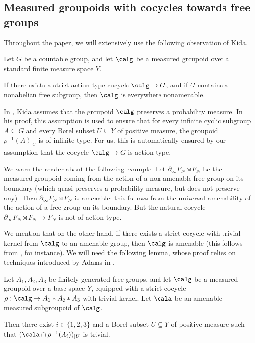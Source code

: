 \subsection{Measured groupoids with cocycles towards free groups}

Throughout the paper, we will extensively use the following observation of Kida.

\begin{lemma}\label{lemma:everywhere-nonamenable}
Let $G$ be a countable group, and let $\calg$ be a measured groupoid over a standard finite measure space $Y$.

If there exists a strict action-type cocycle $\calg\to G$, and if $G$ contains a nonabelian free subgroup, then $\calg$ is everywhere nonamenable.
\end{lemma}

\begin{rk}\label{rk:action-type}
In \cite[Lem.\,3.20]{Kid}, Kida assumes that the groupoid $\calg$ preserves a probability measure. In his proof, this assumption is used to ensure that for every infinite cyclic subgroup $A\subseteq G$ and every Borel subset $U\subseteq Y$ of positive measure, the groupoid $\rho^{-1}(A)_{|U}$ is of infinite type. For us, this is automatically ensured by our assumption that the cocycle $\calg\to G$ is action-type.

We warn the reader about the following example. Let $\partial_\infty F_N\rtimes F_N$ be the measured groupoid coming from the action of a non-amenable free group on its boundary (which quasi-preserves a probability measure, but does not preserve any). Then $\partial_\infty F_N\rtimes F_N$ is amenable: this follows from the universal amenability of the action of a free group on its boundary. But the natural cocycle $\partial_\infty F_N\rtimes F_N\to F_N$ is not of action type.
\end{rk}

We mention that on the other hand, if there exists a strict cocycle with trivial kernel from $\calg$ to an amenable group, then $\calg$ is amenable (this follows from \cite[Prop.\,4.33]{Kid-memoir}, for instance). We will need the following lemma, whose proof relies on techniques introduced by Adams in \cite{Ada}.

\begin{lemma}\label{lemma:free}
Let $A_1,A_2,A_3$ be finitely generated free groups, and let $\calg$ be a measured groupoid over a base space $Y$, equipped with a strict cocycle $\rho:\calg\to A_1\ast A_2\ast A_3$ with trivial kernel. Let $\cala$ be an amenable measured subgroupoid of $\calg$.

Then there exist $i\in\{1,2,3\}$ and a Borel subset $U\subseteq Y$ of positive measure such that $(\cala\cap \rho^{-1}(A_i))_{|U}$ is trivial.
\end{lemma}

